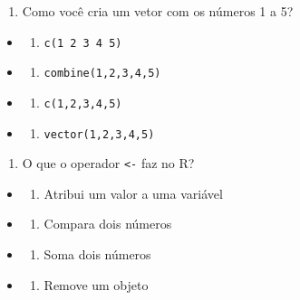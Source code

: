 \documentclass[
]{book}
\providecommand{\tightlist}{%
  \setlength{\itemsep}{0pt}\setlength{\parskip}{0pt}}
\begin{document}
\begin{enumerate}
\def\labelenumi{\arabic{enumi}.}
\setcounter{enumi}{3}
\tightlist
\item
  Como você cria um vetor com os números 1 a 5?
\end{enumerate}

\begin{itemize}
\tightlist
\item
  \begin{enumerate}
  \def\labelenumi{\alph{enumi})}
  \tightlist
  \item
    \texttt{c(1\ 2\ 3\ 4\ 5)}
  \end{enumerate}
\item
  \begin{enumerate}
  \def\labelenumi{\alph{enumi})}
  \setcounter{enumi}{1}
  \tightlist
  \item
    \texttt{combine(1,2,3,4,5)}
  \end{enumerate}
\item
  \begin{enumerate}
  \def\labelenumi{\alph{enumi})}
  \setcounter{enumi}{2}
  \tightlist
  \item
    \texttt{c(1,2,3,4,5)}
  \end{enumerate}
\item
  \begin{enumerate}
  \def\labelenumi{\alph{enumi})}
  \setcounter{enumi}{3}
  \tightlist
  \item
    \texttt{vector(1,2,3,4,5)}
  \end{enumerate}
\end{itemize}

\begin{enumerate}
\def\labelenumi{\arabic{enumi}.}
\setcounter{enumi}{4}
\tightlist
\item
  O que o operador \texttt{\textless{}-} faz no R?
\end{enumerate}

\begin{itemize}
\tightlist
\item
  \begin{enumerate}
  \def\labelenumi{\alph{enumi})}
  \tightlist
  \item
    Atribui um valor a uma variável
  \end{enumerate}
\item
  \begin{enumerate}
  \def\labelenumi{\alph{enumi})}
  \setcounter{enumi}{1}
  \tightlist
  \item
    Compara dois números
  \end{enumerate}
\item
  \begin{enumerate}
  \def\labelenumi{\alph{enumi})}
  \setcounter{enumi}{2}
  \tightlist
  \item
    Soma dois números
  \end{enumerate}
\item
  \begin{enumerate}
  \def\labelenumi{\alph{enumi})}
  \setcounter{enumi}{3}
  \tightlist
  \item
    Remove um objeto
  \end{enumerate}
\end{itemize}
\end{document}
